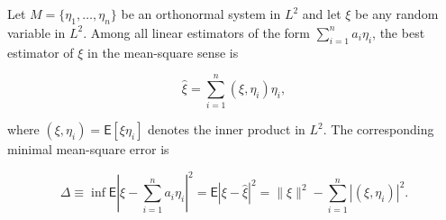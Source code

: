Let $M = \{\eta_1, \ldots, \eta_n\}$ be an orthonormal system in $L^2$ and let $\xi$ be any random variable in $L^2$. Among all linear estimators of the form $\sum_{i=1}^{n} a_i \eta_i$, the best estimator of $\xi$ in the mean-square sense is

$$\hat{\xi} = \sum_{i=1}^{n} (\xi, \eta_i) \eta_i,$$

where $(\xi, \eta_i) = \mathsf{E}[\xi \eta_i]$ denotes the inner product in $L^2$. The corresponding minimal mean-square error is

$$\Delta \equiv \inf \mathsf{E}\left|\xi - \sum_{i=1}^{n} a_i \eta_i\right|^2 = \mathsf{E}|\xi - \hat{\xi}|^2 = \|\xi\|^2 - \sum_{i=1}^{n} |(\xi, \eta_i)|^2.$$
